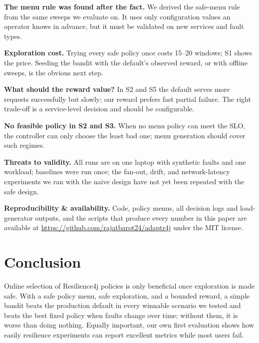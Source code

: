 \documentclass[journal]{IEEEtran}
\newcommand{\rFJ}{Resilience4j\xspace}
\begin{document}
\textbf{The menu rule was found after the fact.} We derived the safe-menu rule from the same
sweeps we evaluate on. It uses only configuration values an operator knows in advance, but it
must be validated on new services and fault types.

\textbf{Exploration cost.} Trying every safe policy once costs 15--20 windows; S1 shows the price.
Seeding the bandit with the default's observed reward, or with offline sweeps, is the obvious
next step.

\textbf{What should the reward value?} In S2 and S5 the default serves more requests
successfully but slowly; our reward prefers fast partial failure. The right trade-off is a
service-level decision and should be configurable.

\textbf{No feasible policy in S2 and S3.} When no menu policy can meet the SLO, the controller can
only choose the least bad one; menu generation should cover such regimes.

\textbf{Threats to validity.} All runs are on one laptop with synthetic faults and one workload;
baselines were run once; the fan-out, drift, and network-latency experiments we ran with the naive
design have not yet been repeated with the safe design.

\textbf{Reproducibility \& availability.} Code, policy menus, all decision logs and load-generator
outputs, and the scripts that produce every number in this paper are available at
\url{https://github.com/rajatbarot24/adaptr4j} under the MIT license.

\section{Conclusion}

Online selection of \rFJ policies is only beneficial once exploration is made safe. With a safe
policy menu, safe exploration, and a bounded reward, a simple bandit beats the production default in
every winnable scenario we tested and beats the best fixed policy when faults change over time;
without them, it is worse than doing nothing. Equally important, our own first evaluation shows how
easily resilience experiments can report excellent metrics while most users fail.



\end{document}

